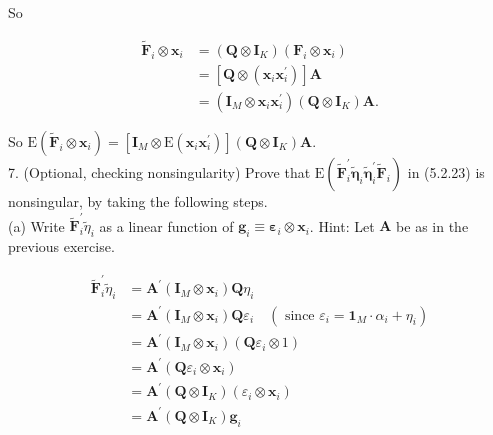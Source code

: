 \documentclass[10pt]{article}
\begin{document}
So

$$
\begin{aligned}
\widetilde{\mathbf{F}}_{i} \otimes \mathbf{x}_{i} & =\left(\mathbf{Q} \otimes \mathbf{I}_{K}\right)\left(\mathbf{F}_{i} \otimes \mathbf{x}_{i}\right) \\
& =\left[\mathbf{Q} \otimes\left(\mathbf{x}_{i} \mathbf{x}_{i}^{\prime}\right)\right] \mathbf{A} \\
& =\left(\mathbf{I}_{M} \otimes \mathbf{x}_{i} \mathbf{x}_{i}^{\prime}\right)\left(\mathbf{Q} \otimes \mathbf{I}_{K}\right) \mathbf{A} .
\end{aligned}
$$

So $\mathrm{E}\left(\widetilde{\mathbf{F}}_{i} \otimes \mathbf{x}_{i}\right)=\left[\mathbf{I}_{M} \otimes \mathrm{E}\left(\mathbf{x}_{i} \mathbf{x}_{i}^{\prime}\right)\right]\left(\mathbf{Q} \otimes \mathbf{I}_{K}\right) \mathbf{A}$.\\
7. (Optional, checking nonsingularity) Prove that $\mathrm{E}\left(\widetilde{\mathbf{F}}_{i}^{\prime} \tilde{\boldsymbol{\eta}}_{i} \tilde{\boldsymbol{\eta}}_{i}^{\prime} \widetilde{\mathbf{F}}_{i}\right)$ in (5.2.23) is nonsingular, by taking the following steps.\\
(a) Write $\widetilde{\mathbf{F}}_{i}^{\prime} \tilde{\eta}_{i}$ as a linear function of $\mathbf{g}_{i} \equiv \boldsymbol{\varepsilon}_{i} \otimes \mathbf{x}_{i}$. Hint: Let $\mathbf{A}$ be as in the previous exercise.

$$
\begin{aligned}
\widetilde{\mathbf{F}}_{i}^{\prime} \tilde{\eta}_{i} & =\mathbf{A}^{\prime}\left(\mathbf{I}_{M} \otimes \mathbf{x}_{i}\right) \mathbf{Q} \eta_{i} \\
& =\mathbf{A}^{\prime}\left(\mathbf{I}_{M} \otimes \mathbf{x}_{i}\right) \mathbf{Q} \varepsilon_{i} \quad\left(\text { since } \varepsilon_{i}=\mathbf{1}_{M} \cdot \alpha_{i}+\eta_{i}\right) \\
& =\mathbf{A}^{\prime}\left(\mathbf{I}_{M} \otimes \mathbf{x}_{i}\right)\left(\mathbf{Q} \varepsilon_{i} \otimes 1\right) \\
& =\mathbf{A}^{\prime}\left(\mathbf{Q} \varepsilon_{i} \otimes \mathbf{x}_{i}\right) \\
& =\mathbf{A}^{\prime}\left(\mathbf{Q} \otimes \mathbf{I}_{K}\right)\left(\varepsilon_{i} \otimes \mathbf{x}_{i}\right) \\
& =\mathbf{A}^{\prime}\left(\mathbf{Q} \otimes \mathbf{I}_{K}\right) \mathbf{g}_{i}
\end{aligned}
$$
\end{document}
